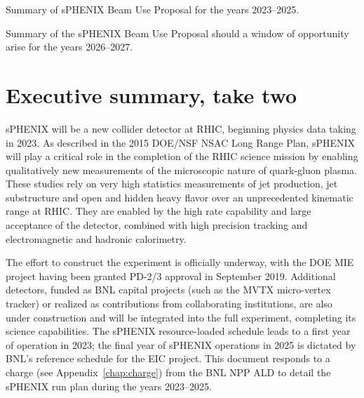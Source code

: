 \begin{table}[hbt!]
\centering
\caption{Summary of sPHENIX Beam Use Proposal for the years 2023--2025.
\label{tab:exec:summary1}}
\bigskip
\centering

\end{table}

\begin{table}[h]
\centering
\caption{Summary of the sPHENIX Beam Use Proposal should a window of
  opportunity arise for the years 2026--2027. \label{tab:exec:summary2}}
\bigskip
\centering

\end{table}

\chapter*{Executive summary, take two}
sPHENIX will be a new collider detector at RHIC, beginning physics data taking in 2023. As described in the 2015 DOE/NSF NSAC Long Range Plan, sPHENIX will play a critical role in the completion of the RHIC science mission by enabling qualitatively new measurements of the microscopic nature of quark-gluon plasma. These studies rely on very high statistics measurements of jet production, jet substructure and open and hidden heavy flavor over an unprecedented kinematic range at RHIC.  They are enabled by the high rate capability and large acceptance of the detector, combined with high precision tracking and electromagnetic and hadronic calorimetry.

The effort to construct the experiment is officially underway, with the DOE MIE project having been granted PD-2/3 approval in September 2019.  Additional detectors, funded as BNL capital
projects (such as the MVTX micro-vertex tracker) or realized as contributions from collaborating institutions, are also under construction and will be integrated into the full experiment, completing its science capabilities.  The sPHENIX resource-loaded schedule leads to a first year of operation in 2023; the final year of sPHENIX operations in 2025 is dictated by BNL's reference schedule for the EIC project.  This document responds to a charge (see Appendix~\ref{chap:charge}) from the BNL NPP ALD to detail the sPHENIX run plan during the years 2023--2025.

